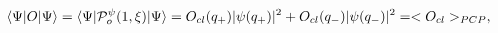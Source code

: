 \begin{equation}
\label{firstmomentum}
\langle \Psi|O|\Psi \rangle = \langle \Psi|{\cal P}^{\psi}_o(1,\xi)|\Psi 
\rangle = O_{cl}(q_+) |\psi(q_+)|^2 + O_{cl}(q_-) |\psi(q_-)|^2 =
< O_{cl} >_{PCP},
\end{equation}

